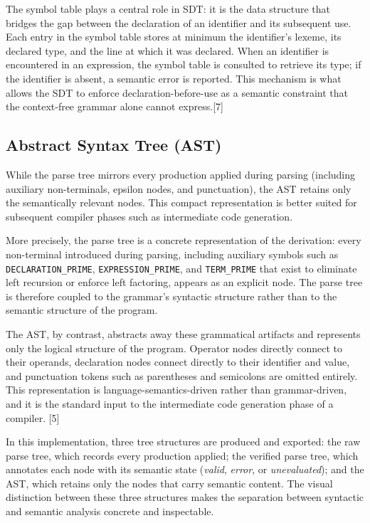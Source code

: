 \documentclass[letterpaper,12pt,oneside]{article}
\begin{document}
The symbol table plays a central role in SDT: it is the data structure that bridges the gap between the declaration of an identifier and its subsequent use. Each entry in the symbol table stores at minimum the identifier's lexeme, its declared type, and the line at which it was declared. When an identifier is encountered in an expression, the symbol table is consulted
to retrieve its type; if the identifier is absent, a semantic error is reported. This mechanism is what allows the SDT to enforce
declaration-before-use as a semantic constraint that the context-free grammar alone cannot express.[7]

\subsection{Abstract Syntax Tree (AST)}

While the parse tree mirrors every production applied during parsing
(including auxiliary non-terminals, epsilon nodes, and punctuation), the AST retains only the semantically relevant nodes. This compact representation is better suited for subsequent compiler phases such as intermediate code generation.

More precisely, the parse tree is a concrete representation of the
derivation: every non-terminal introduced during parsing, including auxiliary symbols such as \texttt{DECLARATION\_PRIME}, \texttt{EXPRESSION\_PRIME}, and \texttt{TERM\_PRIME} that exist to eliminate left recursion or enforce left factoring, appears as an explicit node. The parse tree is therefore coupled to the grammar's syntactic structure rather than to the
semantic structure of the program.

The AST, by contrast, abstracts away these grammatical artifacts and
represents only the logical structure of the program. Operator nodes directly connect to their operands, declaration nodes connect directly to their identifier and value, and punctuation tokens such as parentheses and semicolons are omitted entirely. This representation is language-semantics-driven rather than grammar-driven, and it is the standard input to the intermediate code generation phase of a compiler. [5]

In this implementation, three tree structures are produced and exported: the raw parse tree, which records every production applied; the verified parse tree, which annotates each node with its semantic state (\textit{valid}, \textit{error}, or \textit{unevaluated}); and the AST, which retains only
the nodes that carry semantic content. The visual distinction between these three structures makes the separation between syntactic and semantic analysis concrete and inspectable.
\end{document}
